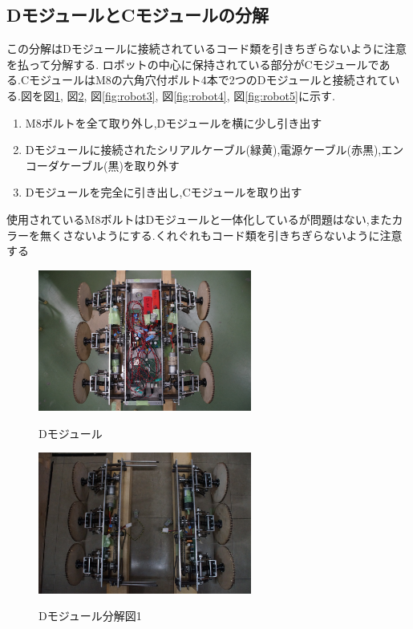 \subsection{DモジュールとCモジュールの分解}
この分解はDモジュールに接続されているコード類を引きちぎらないように注意を払って分解する.
ロボットの中心に保持されている部分がCモジュールである.CモジュールはM8の六角穴付ボルト4本で2つのDモジュールと接続されている.図を図\ref{fig:robot1}, 図\ref{fig:robot2}, 図\ref{fig:robot3}, 図\ref{fig:robot4}, 図\ref{fig:robot5}に示す.
\begin{enumerate}
 \item M8ボルトを全て取り外し,Dモジュールを横に少し引き出す
 \item Dモジュールに接続されたシリアルケーブル(緑黄),電源ケーブル(赤黒),エンコーダケーブル(黒)を取り外す
 \item Dモジュールを完全に引き出し,Cモジュールを取り出す
\end{enumerate}
使用されているM8ボルトはDモジュールと一体化しているが問題はない,またカラーを無くさないようにする.くれぐれもコード類を引きちぎらないように注意する

\begin{figure}[htp]
 \begin{center}
  \includegraphics[width=70mm]{img/hard/f12.jpg}
 　\caption{Dモジュール}
  \label{fig:robot1}%
 \end{center}
\end{figure}


\begin{figure}[htp]
 \begin{center}
  \includegraphics[width=70mm]{img/hard/f10.jpg}
 　\caption{Dモジュール分解図1}
  \label{fig:robot2}%
 \end{center}
\end{figure}

